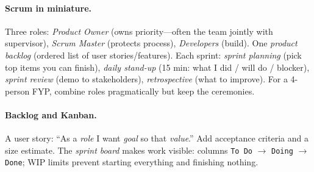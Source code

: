\paragraph{Scrum in miniature.} Three roles: \emph{Product Owner} (owns priority---often the team jointly with supervisor), \emph{Scrum Master} (protects process), \emph{Developers} (build). One \emph{product backlog} (ordered list of user stories/features). Each sprint: \emph{sprint planning} (pick top items you can finish), \emph{daily stand-up} (15 min: what I did / will do / blocker), \emph{sprint review} (demo to stakeholders), \emph{retrospective} (what to improve). For a 4-person FYP, combine roles pragmatically but keep the ceremonies.

\paragraph{Backlog and Kanban.} A user story: ``As a \emph{role} I want \emph{goal} so that \emph{value}.'' Add acceptance criteria and a size estimate. The \emph{sprint board} makes work visible: columns \texttt{To Do} $\to$ \texttt{Doing} $\to$ \texttt{Done}; WIP limits prevent starting everything and finishing nothing.

